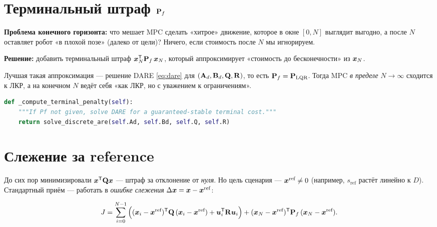 \section{Терминальный штраф $\mathbf{P}_f$}

\begin{ideabox}
\textbf{Проблема конечного горизонта:} что мешает MPC сделать «хитрое»
движение, которое в окне $[0, N]$ выглядит выгодно, а после $N$
оставляет робот «в плохой позе» (далеко от цели)? Ничего, если стоимость
после $N$ мы игнорируем.

\textbf{Решение:} добавить терминальный штраф $\bm{x}_N^{\mathsf{T}} \mathbf{P}_f\,
\bm{x}_N$, который аппроксимирует «стоимость до бесконечности» из
$\bm{x}_N$.

Лучшая такая аппроксимация --- решение DARE \eqref{eq:dare} для
$(\mathbf{A}_d, \mathbf{B}_d, \mathbf{Q}, \mathbf{R})$, то есть $\mathbf{P}_f = \mathbf{P}_\text{LQR}$.
Тогда MPC \emph{в пределе} $N \to \infty$ сходится к ЛКР, а на конечном
$N$ ведёт себя «как ЛКР, но с уважением к ограничениям».
\end{ideabox}

\begin{codebox}[title={\filepath{mpc\_controller.py:126}}]
\begin{lstlisting}[language=Python]
def _compute_terminal_penalty(self):
    """If Pf not given, solve DARE for a guaranteed-stable terminal cost."""
    return solve_discrete_are(self.Ad, self.Bd, self.Q, self.R)
\end{lstlisting}
\end{codebox}

\section{Слежение за reference}

До сих пор минимизировали $\bm{x}^{\mathsf{T}} \mathbf{Q}\bm{x}$ --- штраф за
отклонение от \emph{нуля}. Но цель сценария --- $\bm{x}^\text{ref} \ne 0$
(например, $s_\text{ref}$ растёт линейно к $D$). Стандартный приём ---
работать в \emph{ошибке слежения} $\Delta\bm{x} = \bm{x} - \bm{x}^\text{ref}$:

\begin{equation}
  J = \sum_{i=0}^{N-1}\Big((\bm{x}_i - \bm{x}^\text{ref})^{\mathsf{T}} \mathbf{Q}\,(\bm{x}_i - \bm{x}^\text{ref})
        + \bm{u}_i^{\mathsf{T}} \mathbf{R}\bm{u}_i\Big)
        + (\bm{x}_N - \bm{x}^\text{ref})^{\mathsf{T}} \mathbf{P}_f\,(\bm{x}_N - \bm{x}^\text{ref}).
  \label{eq:mpc_tracking}
\end{equation}

